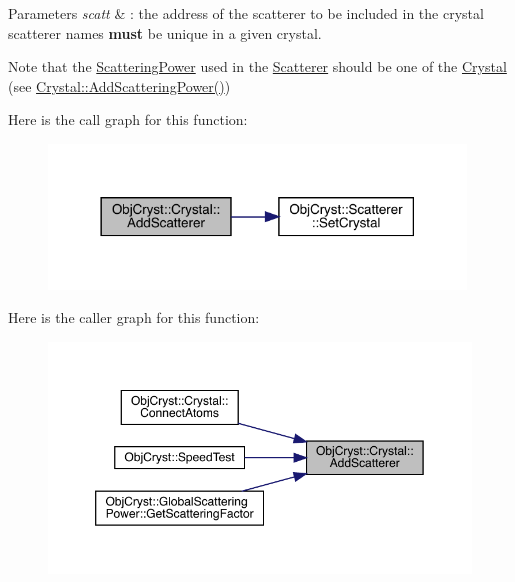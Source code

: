 \begin{DoxyParams}{Parameters}
{\em scatt} & \+: the address of the scatterer to be included in the crystal scatterer names {\bfseries{must}} be unique in a given crystal. \\
\hline
\end{DoxyParams}
\begin{DoxyNote}{Note}
that the \mbox{\hyperlink{class_obj_cryst_1_1_scattering_power}{Scattering\+Power}} used in the \mbox{\hyperlink{class_obj_cryst_1_1_scatterer}{Scatterer}} should be one of the \mbox{\hyperlink{class_obj_cryst_1_1_crystal}{Crystal}} (see \mbox{\hyperlink{class_obj_cryst_1_1_crystal_a76d2d19234fbc5733f5c565a4bf9a1c7}{Crystal\+::\+Add\+Scattering\+Power()}}) 
\end{DoxyNote}
Here is the call graph for this function\+:
\nopagebreak
\begin{figure}[H]
\begin{center}
\leavevmode
\includegraphics[width=314pt]{class_obj_cryst_1_1_crystal_acee480ad824aa0eedf78a4fa414cf347_cgraph}
\end{center}
\end{figure}
Here is the caller graph for this function\+:
\nopagebreak
\begin{figure}[H]
\begin{center}
\leavevmode
\includegraphics[width=350pt]{class_obj_cryst_1_1_crystal_acee480ad824aa0eedf78a4fa414cf347_icgraph}
\end{center}
\end{figure}
\mbox{\label{class_obj_cryst_1_1_crystal_a76d2d19234fbc5733f5c565a4bf9a1c7}} 
